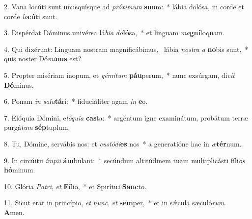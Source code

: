 2. Vana locúti sunt unusquísque ad \textit{pró}\textit{xi}\textit{mum} \textbf{su}um:~*  lábia dolósa, in corde et corde \textit{lo}\textbf{cú}ti sunt.\

3. Dispérdat Dóminus univérsa lá\textit{bi}\textit{a} \textit{do}\textbf{ló}sa,~*  et linguam \textit{ma}\textbf{gní}loquam.\

4. Qui dixérunt: Linguam nostram magnificábimus, \dag\  lábia \textit{nos}\textit{tra} \textit{a} \textbf{no}bis sunt,~*  quis noster Dó\textit{mi}\textbf{nus} est?\

5. Propter misériam ínopum, et \textit{gé}\textit{mi}\textit{tum} \textbf{páu}perum,~*  nunc exsúrgam, di\textit{cit} \textbf{Dó}minus.\

6. Ponam \textit{in} \textit{sa}\textit{lu}\textbf{tá}ri:~*  fiduciáliter agam \textit{in} \textbf{e}o.\

7. Elóquia Dómini, e\textit{ló}\textit{qui}\textit{a} \textbf{cas}ta:~*  argéntum igne examinátum, probátum terræ purgá\textit{tum} \textbf{sép}tuplum.\

8. Tu, Dómine, servábis nos: et \textit{cus}\textit{tó}\textit{di}\textbf{es} nos~*  a generatióne hac in \textit{æ}\textbf{tér}num.\

9. In circúitu \textit{ím}\textit{pi}\textit{i} \textbf{ám}bulant:~*  secúndum altitúdinem tuam multiplicásti fíli\textit{os} \textbf{hó}minum.\

10. Glória \textit{Pa}\textit{tri}, \textit{et} \textbf{Fí}lio,~*  et Spirítu\textit{i} \textbf{Sanc}to.\

11. Sicut erat in princípio, \textit{et} \textit{nunc}, \textit{et} \textbf{sem}per,~*  et in sǽcula sæculó\textit{rum}. \textbf{A}men.\

